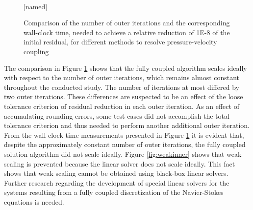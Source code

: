 \begin{figure}[h!]
  \begin{center}
    \\
  \ref{named}
  \end{center}
  \caption{Comparison of the number of outer iterations and the corresponding wall-clock time, needed to achieve a relative reduction of 1E-8 of the initial residual, for different methods to resolve pressure-velocity coupling}
  \label{fig:weak}
\end{figure}

The comparison in Figure \ref{fig:weak} shows that the fully coupled algorithm scales ideally with respect to the number of outer iterations, which remains almost constant throughout the conducted study. The number of iterations at most differed by two outer iterations. These differences are suspected to be an effect of the loose tolerance criterion of residual reduction in each outer iteration. As an effect of accumulating rounding errors, some test cases did not accomplish the total tolerance criterion and thus needed to perform another additional outer iteration. From the wall-clock time measurements presented in Figure \ref{fig:weak} it is evident that, despite the approximately constant number of outer iterations, the fully coupled solution algorithm did not scale ideally. Figure \ref{fig:weakinner} shows that weak scaling is prevented because the linear solver does not scale ideally. This fact shows that weak scaling cannot be obtained using black-box linear solvers. Further research regarding the development of special linear solvers for the systems resulting from a fully coupled discretization of the Navier-Stokes equations is needed.

